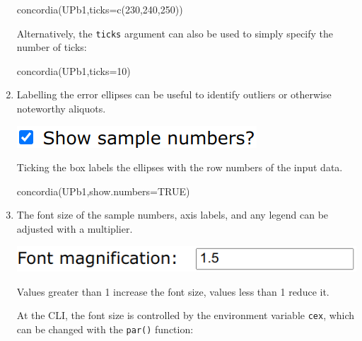 \begin{refsection}
\begin{enumerate}
\begin{console}
concordia(UPb1,ticks=c(230,240,250))
\end{console}

Alternatively, the \texttt{ticks} argument can also be used to simply
specify the number of ticks:

\begin{console}
concordia(UPb1,ticks=10)
\end{console}

\item Labelling the error ellipses can be useful to identify outliers
  or otherwise noteworthy aliquots.

  \noindent\begin{minipage}[t]{.25\linewidth}
  \strut\vspace*{-\baselineskip}\newline
  \includegraphics[width=\linewidth]{../figures/concordiashownumbers.png}
\end{minipage}
\begin{minipage}[t]{.75\linewidth}
  Ticking the box labels the ellipses with the row numbers of the
  input data.
\end{minipage}

\begin{console}
concordia(UPb1,show.numbers=TRUE)
\end{console}

\item The font size of the sample numbers, axis labels, and any legend
  can be adjusted with a multiplier.

\noindent\begin{minipage}[t]{.4\linewidth}
\strut\vspace*{-\baselineskip}\newline
\includegraphics[width=\linewidth]{../figures/concordiacex.png}
\end{minipage}
\begin{minipage}[t]{.6\linewidth}
Values greater than 1 increase the font size, values less than 1
reduce it.  
\end{minipage}

At the CLI, the font size is controlled by the environment variable
\texttt{cex}, which can be changed with the \texttt{par()} function:


\end{enumerate}
\end{refsection}

